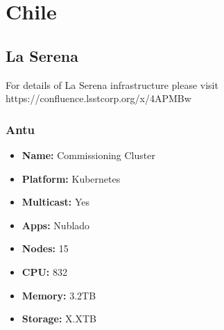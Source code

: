 \section{Chile}
\subsection{La Serena}
For details of La Serena infrastructure please visit https://confluence.lsstcorp.org/x/4APMBw

\newpage
\subsubsection{Antu}
\begin{itemize}
  \itemsep0em 
  \item \textbf{Name:}      Commissioning Cluster
  \item \textbf{Platform:}  Kubernetes
  \item \textbf{Multicast:} Yes
  \item \textbf{Apps:}      Nublado
  \item \textbf{Nodes:}     15
  \item \textbf{CPU:}       832
  \item \textbf{Memory:}    3.2TB
  \item \textbf{Storage:}   X.XTB
\end{itemize}
